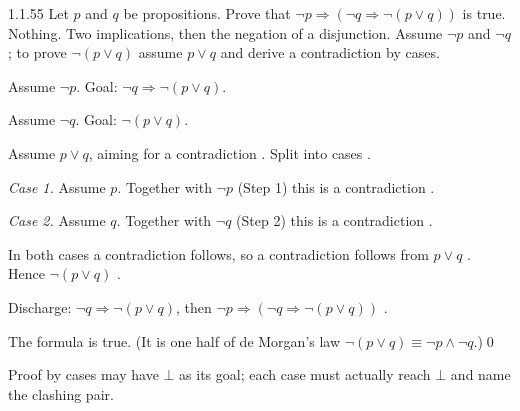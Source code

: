 \begin{bookex}[recommended]{1.1.55}
Let $p$ and $q$ be propositions. Prove that $\neg p\Rightarrow(\neg q\Rightarrow\neg(p\vee q))$ is true.
\solution
\given Nothing.
\goal Two implications, then the negation of a disjunction.
\plan Assume $\neg p$ and $\neg q$; to prove $\neg(p\vee q)$ assume $p\vee q$ and derive a contradiction by cases.
\begin{steps}
\item Assume $\neg p$. Goal: $\neg q\Rightarrow\neg(p\vee q)$.
\item Assume $\neg q$. Goal: $\neg(p\vee q)$.
\item Assume $p\vee q$, aiming for a contradiction . Split into cases .
\item \emph{Case 1.} Assume $p$. Together with $\neg p$ (Step 1) this is a contradiction .
\item \emph{Case 2.} Assume $q$. Together with $\neg q$ (Step 2) this is a contradiction .
\item In both cases a contradiction follows, so a contradiction follows from $p\vee q$ . Hence $\neg(p\vee q)$ .
\item Discharge: $\neg q\Rightarrow\neg(p\vee q)$, then $\neg p\Rightarrow(\neg q\Rightarrow\neg(p\vee q))$ .
\end{steps}
\conclusion The formula is true. (It is one half of de Morgan's law $\neg(p\vee q)\equiv\neg p\wedge\neg q$.)\qed
\begin{compare}
\item Proof by cases may have $\bot$ as its goal; each case must actually reach $\bot$ and name the clashing pair.
\end{compare}
\end{bookex}

